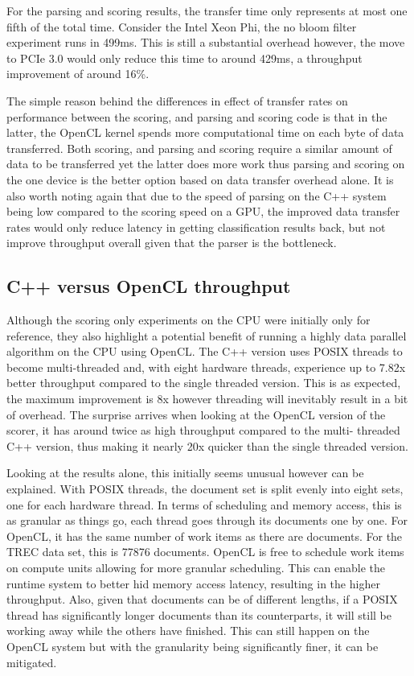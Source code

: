 For the parsing and scoring results, the transfer time only represents at most
one fifth of the total time. Consider the Intel Xeon Phi, the no bloom filter
experiment runs in 499ms. This is still a substantial overhead however, the move
to PCIe 3.0 would only reduce this time to around 429ms, a throughput
improvement of around 16\%.

The simple reason behind the differences in effect of transfer rates on
performance between the scoring, and parsing and scoring code is that in the
latter, the OpenCL kernel spends more computational time on each byte of data
transferred. Both scoring, and parsing and scoring require a similar amount of
data to be transferred yet the latter does more work thus parsing and scoring on
the one device is the better option based on data transfer overhead alone. It is
also worth noting again that due to the speed of parsing on the C++ system being
low compared to the scoring speed on a GPU, the improved data transfer rates
would only reduce latency in getting classification results back, but not
improve throughput overall given that the parser is the bottleneck.

\subsection{C++ versus OpenCL throughput}

Although the scoring only experiments on the CPU were initially only for
reference, they also highlight a potential benefit of running a highly data
parallel algorithm on the CPU using OpenCL. The C++ version uses POSIX threads
to become multi-threaded and, with eight hardware threads, experience up to
7.82x better throughput compared to the single threaded version. This is as
expected, the maximum improvement is 8x however threading will inevitably result
in a bit of overhead. The surprise arrives when looking at the OpenCL version of
the scorer, it has around twice as high throughput compared to the multi-
threaded C++ version, thus making it nearly 20x quicker than the single threaded
version.

Looking at the results alone, this initially seems unusual however can be
explained. With POSIX threads, the document set is split evenly into eight sets,
one for each hardware thread. In terms of scheduling and memory access, this is
as granular as things go, each thread goes through its documents one by one. For
OpenCL, it has the same number of work items as there are documents. For the
TREC data set, this is 77876 documents. OpenCL is free to schedule work items on
compute units allowing for more granular scheduling. This can enable the runtime
system to better hid memory access latency, resulting in the higher throughput.
Also, given that documents can be of different lengths, if a POSIX thread has
significantly longer documents than its counterparts, it will still be working
away while the others have finished. This can still happen on the OpenCL system
but with the granularity being significantly finer, it can be mitigated.

